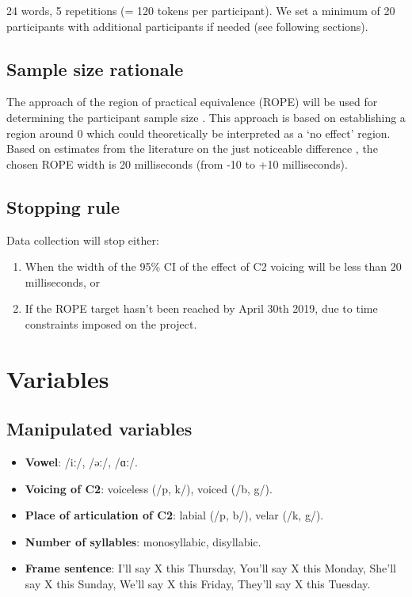 \documentclass[11pt,]{article}
\providecommand{\tightlist}{%
  \setlength{\itemsep}{0pt}\setlength{\parskip}{0pt}}
\begin{document}
24 words, 5 repetitions (= 120 tokens per participant). We set a minimum
of 20 participants with additional participants if needed (see following
sections).

\hypertarget{sample-size-rationale}{%
\subsection{Sample size rationale}\label{sample-size-rationale}}

The approach of the region of practical equivalence (ROPE) will be used
for determining the participant sample size
\citep{kruschke2015, vasishth2018a}. This approach is based on
establishing a region around 0 which could theoretically be interpreted
as a `no effect' region. Based on estimates from the literature on the
just noticeable difference \citep{huggins1972, nooteboom1980}, the
chosen ROPE width is 20 milliseconds (from -10 to +10 milliseconds).

\hypertarget{stopping-rule}{%
\subsection{Stopping rule}\label{stopping-rule}}

Data collection will stop either:

\begin{enumerate}
\def\labelenumi{(\alph{enumi})}
\tightlist
\item
  When the width of the 95\% CI of the effect of C2 voicing will be less
  than 20 milliseconds, or
\item
  If the ROPE target hasn't been reached by April 30th 2019, due to time
  constraints imposed on the project.
\end{enumerate}

\hypertarget{variables}{%
\section{Variables}\label{variables}}

\hypertarget{manipulated-variables}{%
\subsection{Manipulated variables}\label{manipulated-variables}}

\label{s:manipulated}

\begin{itemize}
\tightlist
\item
  \textbf{Vowel}: /iː/, /əː/, /ɑː/.
\item
  \textbf{Voicing of C2}: voiceless (/p, k/), voiced (/b, g/).
\item
  \textbf{Place of articulation of C2}: labial (/p, b/), velar (/k, g/).
\item
  \textbf{Number of syllables}: monosyllabic, disyllabic.
\item
  \textbf{Frame sentence}: I'll say X this Thursday, You'll say X this
  Monday, She'll say X this Sunday, We'll say X this Friday, They'll say
  X this Tuesday.
\end{itemize}
\end{document}
